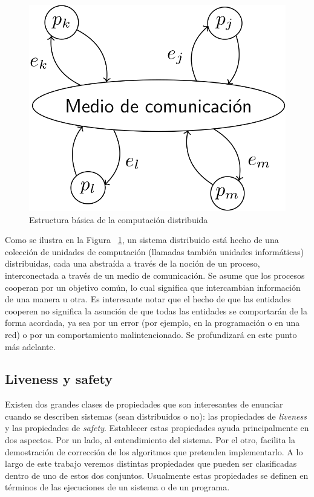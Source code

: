 \begin{figure}
  \centering
  \includegraphics[scale=0.18]{figures/distributed-systems.png}
  \caption{Estructura básica de la computación distribuida}
  \label{fig:distributed-systems}
\end{figure}


Como se ilustra en la Figura ~\ref{fig:distributed-systems}, un sistema distribuido está hecho de una
colección de unidades de computación (llamadas también unidades informáticas) distribuidas, cada una
abstraída a través de la noción de un proceso, interconectada a través de un medio de comunicación.
Se asume que los procesos cooperan por un objetivo común, lo cual significa que intercambian
información de una manera u otra. Es interesante notar que el hecho de que las entidades
cooperen no significa la asunción de que todas las entidades se comportarán de la forma
acordada, ya sea por un error (por ejemplo, en la programación o en una red) o por un comportamiento
malintencionado.
Se profundizará en este punto más adelante. %

\subsection{Liveness y safety}
Existen dos grandes clases de propiedades que son interesantes de enunciar cuando se describen sistemas
(sean distribuidos o no): las propiedades de \textit{liveness} y las propiedades de \textit{safety}.
Establecer estas propiedades ayuda principalmente en dos aspectos. Por un lado, al entendimiento del sistema.
Por el otro, facilita la demostración de corrección de los algoritmos que pretenden implementarlo.
A lo largo de este trabajo veremos distintas propiedades que pueden ser clasificadas dentro
de uno de estos dos conjuntos.
Usualmente estas propiedades se definen en términos de las ejecuciones de un sistema o de un programa.

